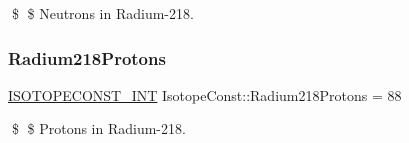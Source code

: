 \$ \$ Neutrons in Radium-\/218. \mbox{\label{group___isotope_const-_radium-_ra218_ga567b555f136f3eb97d30771dfcba338f}} 
\subsubsection{\texorpdfstring{Radium218\+Protons}{Radium218Protons}}
{\footnotesize\ttfamily \mbox{\hyperlink{group___isotope_const-_macros_ga5f18360b3e99483a35c32d789e62621c}{I\+S\+O\+T\+O\+P\+E\+C\+O\+N\+S\+T\+\_\+\+I\+NT}} Isotope\+Const\+::\+Radium218\+Protons = 88}

\$ \$ Protons in Radium-\/218. 